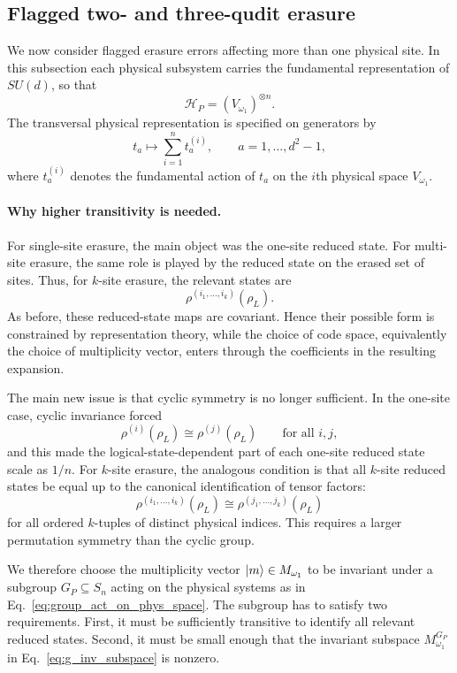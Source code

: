 \documentclass[10pt,twocolumn,superscriptaddress,aps,amsmath,amssymb,citeautoscript,floatfix,prx]{revtex4-2}
\theoremstyle{plain}
\theoremstyle{plain}
\theoremstyle{plain}
\theoremstyle{plain}
\theoremstyle{plain}
\theoremstyle{plain}
\theoremstyle{plain}
\theoremstyle{definition}
\theoremstyle{plain}
\begin{document}
\subsection{Flagged two- and three-qudit erasure}\label{subsec:main_muti_erasure_noise}

We now consider flagged erasure errors affecting more than one physical site. In this subsection each physical subsystem carries 
the fundamental representation of $SU(d)$, so that
$$
\mathcal H_P=(V_{\omega_1})^{\otimes n}.
$$
The transversal physical representation is specified on generators by
$$
t_a
\longmapsto
\sum_{i=1}^n t_a^{(i)},
\qquad
a=1,\ldots,d^2-1,
$$
where $t_a^{(i)}$ denotes the fundamental action of $t_a$ on the $i$th physical space $V_{\omega_1}$.

\paragraph{Why higher transitivity is needed.}

For single-site erasure, the main object was the one-site reduced state. For multi-site erasure, the same role is played by the reduced state on the erased set of sites. 
Thus, for $k$-site erasure, the relevant states are
$$
\rho^{(i_1,\ldots,i_k)}(\rho_L).
$$
As before, these reduced-state maps are covariant. Hence their possible form is constrained by representation theory, while the choice of code space, equivalently 
the choice of multiplicity vector, enters through the coefficients in the resulting expansion.

The main new issue is that cyclic symmetry is no longer sufficient. In the one-site case, cyclic invariance forced
$$
\rho^{(i)}(\rho_L)
\cong
\rho^{(j)}(\rho_L)
\qquad
\text{for all } i,j,
$$
and this made the logical-state-dependent part of each one-site reduced state scale as $1/n$. For $k$-site erasure, 
the analogous condition is that all $k$-site reduced states be equal up to the canonical identification of tensor factors:
$$
\rho^{(i_1,\ldots,i_k)}(\rho_L)
\cong
\rho^{(j_1,\ldots,j_k)}(\rho_L)
$$
for all ordered $k$-tuples of distinct physical indices. This requires a larger permutation symmetry than the cyclic group.

We therefore choose the multiplicity vector $\ket m\in M_{\omega_1}$ to be invariant under a subgroup $G_P\subseteq S_n$ 
acting on the physical systems as in Eq.~\eqref{eq:group_act_on_phys_space}. The subgroup has to satisfy two requirements. 
First, it must be sufficiently transitive to identify all relevant reduced states. 
Second, it must be small enough that the invariant subspace $M_{\omega_1}^{G_P}$ in Eq.~\eqref{eq:g_inv_subspace} is nonzero.
\end{document}
